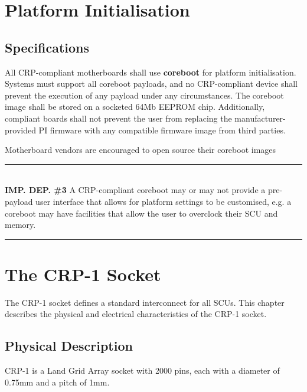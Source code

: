 \documentclass[12pt]{report}
\begin{document}
\chapter{Platform Initialisation}
\newpage


\section{Specifications}
All CRP-compliant motherboards shall use \textbf{coreboot} for platform initialisation. Systems must support all coreboot
payloads, and no CRP-compliant device shall prevent the execution of any payload under any circumstances. The coreboot
image shall be stored on a socketed 64Mb EEPROM chip. Additionally, compliant boards shall not prevent the user from
replacing the manufacturer-provided PI firmware with any compatible firmware image from third parties.

Motherboard vendors are encouraged to open source their coreboot images  

\rule{16cm}{0.4pt}\\
\small
\textbf{IMP. DEP. \#3\:}
A CRP-compliant coreboot may or may not provide a pre-payload user interface that allows for platform settings to be
customised, e.g. a coreboot may have facilities that allow the user to overclock their SCU and memory.\\
\normalsize
\rule{16cm}{0.4pt}

\newpage



\chapter{The CRP-1 Socket}
\large
The CRP-1 socket defines a standard interconnect for all SCUs. This chapter describes the physical and electrical
characteristics of the CRP-1 socket.
\normalsize
\newpage
\section{Physical Description}
CRP-1 is a Land Grid Array socket with 2000 pins, each with a diameter of 0.75mm and a pitch of 1mm. 
\end{document}
